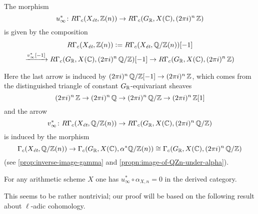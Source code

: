 \begin{definition}
  \label{dfn:u-infty}
  The morphism
  \[ u_\infty^*\colon R\Gamma_c (X_\text{\it ét}, \mathbb{Z}(n)) \to
    R\Gamma_c (G_{\mathbb{R}}, X (\mathbb{C}), (2\pi i)^n\,\mathbb{Z}) \]
  is given by the composition
  \begin{multline*}
    R\Gamma_c (X_\text{\it ét}, \mathbb{Z}(n)) \mathrel{\mathop:}=
    R\Gamma_c (X_\text{\it ét}, \mathbb{Q}/\mathbb{Z} (n)) [-1]\\
    \xrightarrow{v_\infty^* [-1]}
    R\Gamma_c (G_{\mathbb{R}}, X (\mathbb{C}), (2\pi i)^n\,\mathbb{Q}/\mathbb{Z}) [-1] \to
    R\Gamma_c (G_{\mathbb{R}}, X (\mathbb{C}), (2\pi i)^n\,\mathbb{Z})
  \end{multline*}

  \noindent Here the last arrow is induced by
  $(2\pi i)^n\,\mathbb{Q}/\mathbb{Z} [-1] \to (2\pi i)^n\,\mathbb{Z}$, which comes from the
  distinguished triangle of constant $G_{\mathbb{R}}$-equivariant sheaves
  \[ (2\pi i)^n\,\mathbb{Z} \to
    (2\pi i)^n\,\mathbb{Q} \to
    (2\pi i)^n\,\mathbb{Q}/\mathbb{Z} \to
    (2\pi i)^n\,\mathbb{Z} [1] \]
  and the arrow
  \[ v_\infty^*\colon R\Gamma_c (X_\text{\it ét}, \mathbb{Q}/\mathbb{Z} (n)) \to
    R\Gamma_c (G_{\mathbb{R}}, X (\mathbb{C}), (2\pi i)^n\,\mathbb{Q}/\mathbb{Z}) \]
  is induced by the morphism
  \[ \Gamma_c (X_\text{\it ét}, \mathbb{Q}/\mathbb{Z} (n)) \to
    \Gamma_c (G_{\mathbb{R}}, X (\mathbb{C}), \alpha^* \mathbb{Q}/\mathbb{Z} (n)) \cong
    \Gamma_c (G_{\mathbb{R}}, X (\mathbb{C}), (2\pi i)^n\,\mathbb{Q}/\mathbb{Z}) \]
  (see \ref{prop:inverse-image-gamma} and \ref{propn:image-of-QZn-under-alpha}).
\end{definition}

\begin{theorem}
  \label{thm:u-alpha-0}
  For any arithmetic scheme $X$ one has $u_\infty^* \circ \alpha_{X,n} = 0$ in
  the derived category.
\end{theorem}

This seems to be rather nontrivial; our proof will be based on the following
result about $\ell$-adic cohomology.

